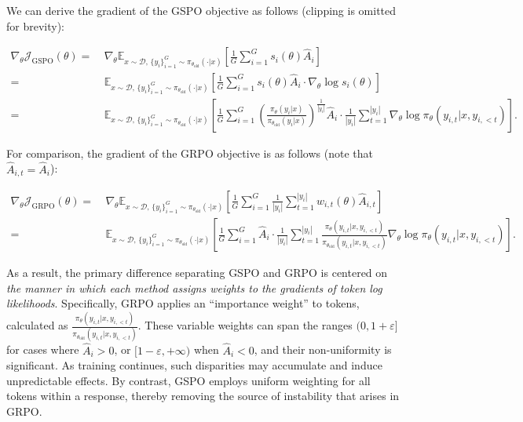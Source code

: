 We can derive the gradient of the GSPO objective as follows (clipping is omitted for brevity):

\begin{align}
\nabla_{\theta} \mathcal{J}_\text{GSPO} (\theta)
=&\ 
\nabla_{\theta} \mathbb{E}_{ x \sim \mathcal{D},\, \{y_i\}_{i=1}^G \sim \pi_{\theta_\text{old}}( \cdot | x) }
\left[ 
\frac{1}{G} \sum_{i=1}^{G} s_{i}(\theta) \widehat{A}_{i}
\right] \\
= &\ 
\mathbb{E}_{ x \sim \mathcal{D},\, \{y_i\}_{i=1}^G \sim \pi_{\theta_\text{old}}( \cdot | x) }
\left[ 
\frac{1}{G} \sum_{i=1}^{G}
s_{i}(\theta) \widehat{A}_{i}
\cdot \nabla_{\theta} \log s_{i}(\theta)
\right] \\
=&\ 
\mathbb{E}_{ x \sim \mathcal{D},\, \{y_i\}_{i=1}^G \sim \pi_{\theta_\text{old}}( \cdot | x) }
\left[ 
\frac{1}{G} \sum_{i=1}^{G} 
\left( \frac{ \pi_{\theta} (y_i | x) }{ \pi_{\theta_\text{old}} (y_i | x)} \right)^{\frac{1}{|y_i|}} \widehat{A}_{i} 
\cdot \frac{1}{|y_i|} \sum_{t=1}^{|y_i|} \nabla_{\theta} \log \pi_{\theta} (y_{i,t} | x, y_{i,<t}) 
\right].
\label{equ:gspo_grad}
\end{align}

For comparison, the gradient of the GRPO objective is as follows (note that $\widehat{A}_{i,t} = \widehat{A}_{i}$):

\begin{align}
\nabla_{\theta} \mathcal{J}_\text{GRPO} (\theta) 
=&\ 
\nabla_{\theta} \mathbb{E}_{ x \sim \mathcal{D},\, \{y_i\}_{i=1}^G \sim \pi_{\theta_\text{old}}( \cdot | x) }
\left[ \frac{1}{G} \sum_{i=1}^{G} \frac{1}{|y_i|} \sum_{t=1}^{|y_i|} 
w_{i,t}(\theta) \widehat{A}_{i,t}
\right] \\
=&\
\mathbb{E}_{ x \sim \mathcal{D},\, \{y_i\}_{i=1}^G \sim \pi_{\theta_\text{old}}( \cdot | x) }
\left[ \frac{1}{G} \sum_{i=1}^{G} \widehat{A}_{i} 
\cdot \frac{1}{|y_i|} \sum_{t=1}^{|y_i|} 
\frac{ \pi_{\theta} (y_{i,t} | x, y_{i,<t}) }{ \pi_{\theta_\text{old}} (y_{i,t} | x,y_{i,<t})} 
\nabla_{\theta} \log \pi_{\theta} (y_{i,t} | x, y_{i,<t})  
\right].
\end{align}

As a result, the primary difference separating GSPO and GRPO is centered on \textit{the manner in which each method assigns weights to the gradients of token log likelihoods}. Specifically, GRPO applies an ``importance weight'' to tokens, calculated as $\frac{ \pi_{\theta} (y_{i,t} | x, y_{i,<t}) }{ \pi_{\theta_\text{old}} (y_{i,t} | x,y_{i,<t})}$. These variable weights can span the ranges $(0, 1+\varepsilon]$ for cases where $\widehat{A}_{i} > 0$, or $[1-\varepsilon, +\infty)$ when $\widehat{A}_{i} < 0$, and their non-uniformity is significant. As training continues, such disparities may accumulate and induce unpredictable effects. By contrast, GSPO employs uniform weighting for all tokens within a response, thereby removing the source of instability that arises in GRPO.

